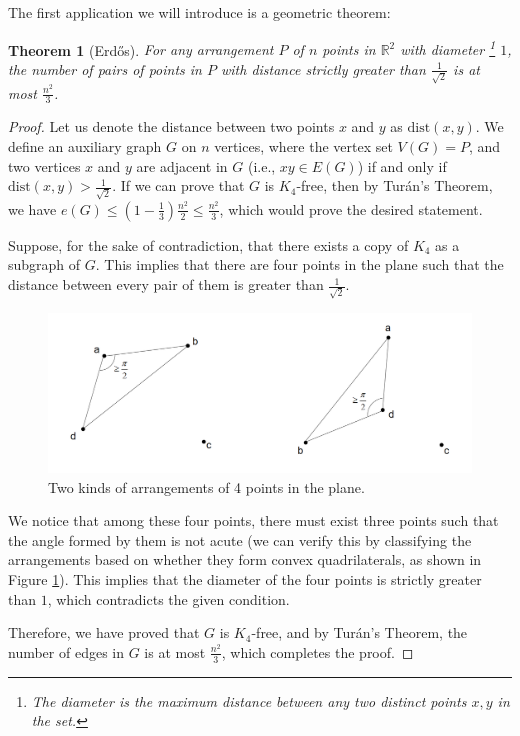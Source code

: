 \documentclass{article}
\newtheorem{theorem}{Theorem}[section]
\theoremstyle{definition}
\def\Erdos{Erd\H{o}s}
\def\Turan{Tur\'an}
\newcommand{\R}{\mathbb{R}}
\begin{document}
The first application we will introduce is a geometric theorem:

\begin{theorem}[\Erdos{}]
    For any arrangement $P$ of $n$ points in $\R^{2}$ with diameter \footnote{The \emph{diameter} is the maximum distance between any two distinct points $x, y$ in the set.} $1$, the number of pairs of points in $P$ with distance strictly greater than $\frac{1}{\sqrt{2}}$ is at most $\frac{n^2}{3}$.
\end{theorem}

\begin{proof}
    Let us denote the distance between two points $x$ and $y$ as $\text{dist}(x, y)$. We define an auxiliary graph $G$ on $n$ vertices, where the vertex set $V(G) = P$, and two vertices $x$ and $y$ are adjacent in $G$ (i.e., $xy \in E(G)$) if and only if $\text{dist}(x, y) > \frac{1}{\sqrt{2}}$. If we can prove that $G$ is $K_4$-free, then by \Turan{}'s Theorem, we have $e(G) \leq (1 - \frac{1}{3}) \frac{n^2}{2} \leq \frac{n^2}{3}$, which would prove the desired statement.
    
    Suppose, for the sake of contradiction, that there exists a copy of $K_4$ as a subgraph of $G$. This implies that there are four points in the plane such that the distance between every pair of them is greater than $\frac{1}{\sqrt{2}}$.

    \begin{figure}[H]
        \centering
        \includegraphics[scale=0.3]{4-1.png}
        \caption{Two kinds of arrangements of 4 points in the plane.}
        \label{fig:4-1}
    \end{figure}

    We notice that among these four points, there must exist three points such that the angle formed by them is not acute (we can verify this by classifying the arrangements based on whether they form convex quadrilaterals, as shown in Figure \ref{fig:4-1}\footnotemark). This implies that the diameter of the four points is strictly greater than $1$, which contradicts the given condition.

    Therefore, we have proved that $G$ is $K_4$-free, and by \Turan{}'s Theorem, the number of edges in $G$ is at most $\frac{n^2}{3}$, which completes the proof.
\end{proof}
\end{document}
